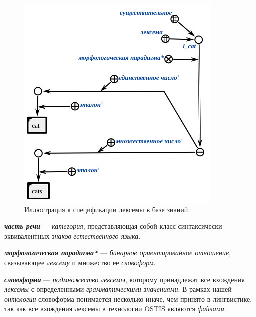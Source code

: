 \begin{figure}[h]
    \centering
    \includegraphics[scale=0.8]{images/part2/chapter_lang/lexeme_example}
    \caption{Иллюстрация к спецификации лексемы в базе знаний.}
    \label{fig:lexeme_example}
\end{figure}

\textbf{\textit{часть речи}} --- \textit{категория}, представляющая собой класс синтаксически эквивалентных \textit{знаков} \textit{естественного языка}.

\begin{SCn}


\end{SCn}

\textbf{\textit{морфологическая парадигма*}} --- \textit{бинарное ориентированное отношение}, связывающее \textit{лексему} и множество ее \textit{словоформ}.

\textbf{\textit{словоформа}} --- \textit{подмножество} \textit{лексемы}, которому принадлежат все вхождения \textit{лексемы} с определенными \textit{грамматическими значениями}.
В рамках нашей \textit{онтологии} словоформа понимается несколько иначе, чем принято в лингвистике, так как все вхождения лексемы в технологии OSTIS являются \textit{файлами}.

